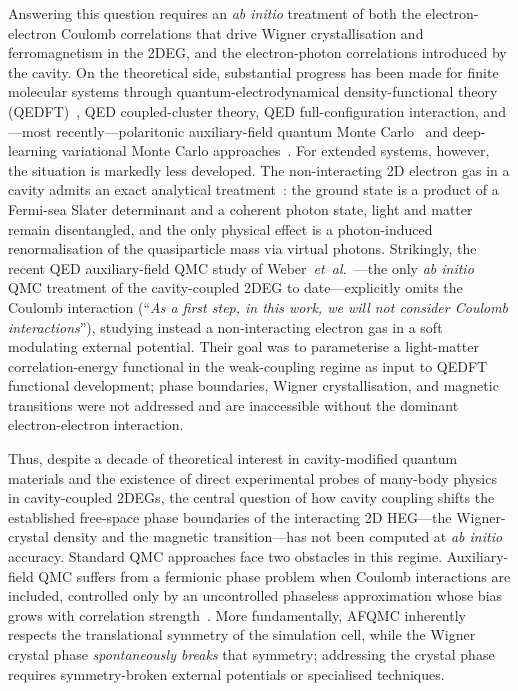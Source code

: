 Answering this question requires an \emph{ab initio} treatment of both
the electron-electron Coulomb correlations that drive Wigner
crystallisation and ferromagnetism in the 2DEG, and the electron-photon
correlations introduced by the cavity. On the theoretical side,
substantial progress has been made for finite molecular systems through
quantum-electrodynamical density-functional theory
(QEDFT)~\cite{Tokatly2013,Ruggenthaler2014,Flick2017,Ruggenthaler2023_review},
QED coupled-cluster theory, QED full-configuration interaction, and—most
recently—polaritonic auxiliary-field quantum Monte Carlo~\cite{Riso2024}
and deep-learning variational Monte Carlo
approaches~\cite{Tang2025}. For extended systems, however, the situation
is markedly less developed. The non-interacting 2D electron gas in a
cavity admits an exact analytical
treatment~\cite{Rokaj2022}: the ground state is a product
of a Fermi-sea Slater determinant and a coherent photon state, light
and matter remain disentangled, and the only physical effect is a
photon-induced renormalisation of the quasiparticle mass via virtual
photons. Strikingly, the recent QED auxiliary-field QMC study of
Weber~\textit{et~al.}~\cite{Weber2025}—the only \emph{ab initio} QMC
treatment of the cavity-coupled 2DEG to date—explicitly omits the
Coulomb interaction (``\emph{As a first step, in this work, we will not
consider Coulomb interactions}''), studying instead a non-interacting
electron gas in a soft modulating external potential. Their goal was to
parameterise a light-matter correlation-energy functional in the
weak-coupling regime as input to QEDFT functional development; phase
boundaries, Wigner crystallisation, and magnetic transitions were not
addressed and are inaccessible without the dominant electron-electron
interaction.

Thus, despite a decade of theoretical interest in cavity-modified
quantum materials and the existence of direct experimental probes of
many-body physics in cavity-coupled 2DEGs, the central question of how
cavity coupling shifts the established free-space phase boundaries of
the interacting 2D HEG—the Wigner-crystal density and the magnetic
transition—has not been computed at \emph{ab initio} accuracy. Standard
QMC approaches face two obstacles in this regime. Auxiliary-field QMC
suffers from a fermionic phase problem when Coulomb interactions are
included, controlled only by an uncontrolled phaseless approximation
whose bias grows with correlation strength~\cite{Riso2024}. More
fundamentally, AFQMC inherently respects the translational symmetry of
the simulation cell, while the Wigner crystal phase \emph{spontaneously
breaks} that symmetry; addressing the crystal phase requires symmetry-broken
external potentials or specialised techniques.

